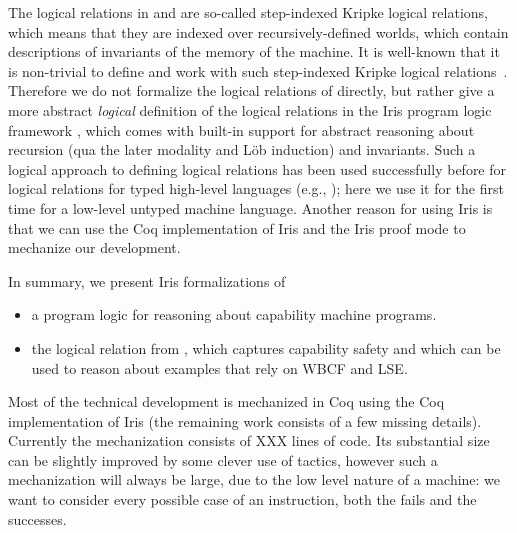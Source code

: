 \documentclass[sigplan,review]{acmart}\settopmatter{printfolios=true,printccs=false,printacmref=false}
\begin{document}
The logical relations in \cite{skorstengaardESOP18} and \cite{SkorstengaardPOPL19} are so-called step-indexed Kripke logical relations, which means that they are indexed over recursively-defined worlds, which contain descriptions of invariants of the memory of the machine.
It is well-known that it is non-trivial to define and work with such step-indexed Kripke logical relations~\cite{ahmed-2002, birkedal2011step}.
Therefore we do not formalize the logical relations of \citeauthor{skorstengaardESOP18} 
directly, but rather give a more abstract \emph{logical} definition of the logical relations in the Iris program logic framework \cite{iris,iris2,iris3, iris-jfp}, which comes with built-in support for abstract reasoning about recursion (qua the later modality and L{\"o}b induction) and invariants.
Such a logical approach to defining logical relations has been used successfully before for logical relations for typed high-level languages (e.g., \cite{lslr-journal,iris:type-effect,rustbelt,runst-popl18}); here we use it for the first time for a low-level untyped machine language.
Another reason for using Iris is that we can use the Coq implementation of Iris and
the Iris proof mode \cite{Krebbers:2017} to mechanize our development. 

In summary, we present Iris formalizations of 
\begin{itemize}
  \item a program logic for reasoning about capability machine programs.
  \item the logical relation from \cite{skorstengaardESOP18}, 
    which captures capability safety and which can be used to reason about examples
    that rely on WBCF and LSE.
\end{itemize}
Most of the technical development is mechanized in Coq using the Coq implementation of Iris (the remaining work consists of a few missing details). Currently the mechanization consists of XXX lines of code. Its substantial size can be slightly improved by some clever use of tactics, however such a mechanization will always be large, due to the low level nature of a machine: we want to consider every possible case of an instruction, both the fails and the successes. 

\end{document}
